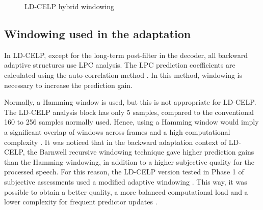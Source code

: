 \begin{figure}[hbtp]
  \begin{center}
  \end{center}
  \caption{ LD-CELP hybrid windowing \label{fig:hybwin} }
\end{figure}


\subsection{Windowing used in the adaptation} 

In LD-CELP, except for the long-term post-filter in the decoder, all
backward adaptive structures use LPC analysis. The LPC prediction
coefficients are calculated using the auto-correlation method 
\cite{Rabiner-Schafer}. In this method, windowing is necessary to
increase the prediction gain.

Normally, a Hamming window is used, but this is not appropriate for
LD-CELP. The LD-CELP analysis block has only 5 samples, compared to
the conventional 160 to 256 samples normally used. Hence, using a
Hamming window would imply a significant overlap of windows across
frames and a high computational complexity \cite{LD-CELP-FixedPt}. It
was noticed that in the backward adaptation context of LD-CELP, the
Barnwell recursive windowing technique \cite{RecursWind} gave higher
prediction gains than the Hamming windowing, in addition to a higher
subjective quality for the processed speech. For this reason, the
LD-CELP version tested in Phase 1 of subjective assessments used a
modified adaptive windowing \cite{LD-CELP-Phase2,LD-CELP-RecurWind}.
This way, it was possible to obtain a better quality, a more balanced
computational load and a lower complexity for frequent predictor
updates \cite{LD-CELP-Phase1}.

